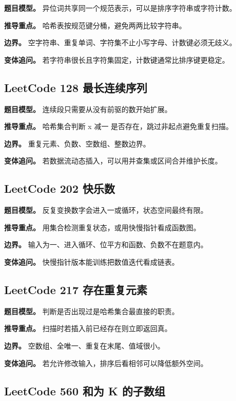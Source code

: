 \textbf{题目模型。} 异位词共享同一个规范表示，可以是排序字符串或字符计数。

\textbf{推导重点。} 哈希表按规范键分桶，避免两两比较字符串。

\textbf{边界。} 空字符串、重复单词、字符集不止小写字母、计数键必须无歧义。

\textbf{变体追问。} 若字符串很长且字符集固定，计数键通常比排序键更稳定。

\subsection{LeetCode 128 最长连续序列}

\textbf{题目模型。} 连续段只需要从没有前驱的数开始扩展。

\textbf{推导重点。} 哈希集合判断 x 减一 是否存在，跳过非起点避免重复扫描。

\textbf{边界。} 重复元素、负数、空数组、整数边界。

\textbf{变体追问。} 若数据流动态插入，可以用并查集或区间合并维护长度。

\subsection{LeetCode 202 快乐数}

\textbf{题目模型。} 反复变换数字会进入一或循环，状态空间最终有限。

\textbf{推导重点。} 用集合检测重复状态，或用快慢指针看成函数图。

\textbf{边界。} 输入为一、进入循环、位平方和函数、负数不在题意内。

\textbf{变体追问。} 快慢指针版本能训练把数值迭代看成链表。

\subsection{LeetCode 217 存在重复元素}

\textbf{题目模型。} 判断是否出现过是哈希集合最直接的职责。

\textbf{推导重点。} 扫描时若插入前已经存在则立即返回真。

\textbf{边界。} 空数组、全唯一、重复在末尾、值域很小。

\textbf{变体追问。} 若允许修改输入，排序后看相邻可以降低额外空间。

\subsection{LeetCode 560 和为 K 的子数组}

